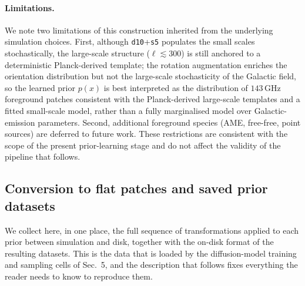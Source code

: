 \documentclass[11pt]{article}
\theoremstyle{definition}
\begin{document}
\paragraph{Limitations.}
We note two limitations of this construction inherited from the underlying simulation choices. First, although \texttt{d10}+\texttt{s5} populates the small scales stochastically, the large-scale structure ($\ell\!\lesssim\!300$) is still anchored to a deterministic Planck-derived template; the rotation augmentation enriches the orientation distribution but not the large-scale stochasticity of the Galactic field, so the learned prior $p(x)$ is best interpreted as the distribution of $143\,\mathrm{GHz}$ foreground patches consistent with the Planck-derived large-scale templates and a fitted small-scale model, rather than a fully marginalised model over Galactic-emission parameters. Second, additional foreground species (AME, free-free, point sources) are deferred to future work. These restrictions are consistent with the scope of the present prior-learning stage and do not affect the validity of the pipeline that follows.

\subsection{Conversion to flat patches and saved prior datasets}
\label{sec:data_savedpriors}

We collect here, in one place, the full sequence of transformations applied to each prior between simulation and disk, together with the on-disk format of the resulting datasets. This is the data that is loaded by the diffusion-model training and sampling cells of Sec.~5, and the description that follows fixes everything the reader needs to know to reproduce them.
\end{document}
